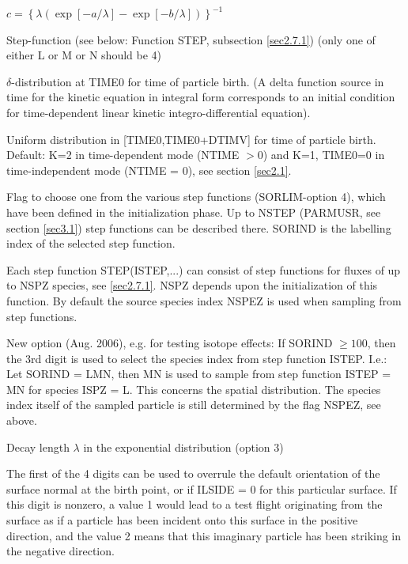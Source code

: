 \begin{list}{ }{}
\begin{list}{ }{}
$c = \left\{ \lambda (\exp[ -a/ \lambda] - \exp[-b/
\lambda])\right\}^{-1}$
\item[{L,M,N = 4 }]
Step-function (see below: Function STEP, subsection \ref{sec2.7.1})
(only one of either
L or M or N should be 4)
\item[{K = 1 }]
$\delta$-distribution at TIME0 for time of particle birth.  (A delta
function source in time for the kinetic equation in integral form
corresponds to an initial condition for time-dependent linear
kinetic integro-differential equation).
\item[{K = 2 }]
Uniform distribution in [TIME0,TIME0+DTIMV] for time of particle
birth.\\
Default: K=2 in time-dependent mode (NTIME $>$0) and K=1, TIME0=0 in
time-independent mode (NTIME = 0), see section \ref{sec2.1}.
\end{list}
\item[{\bf SORIND }]
Flag to choose one from the various step functions (SORLIM-option
4), which have been defined in the initialization phase. Up to NSTEP
(PARMUSR, see section \ref{sec3.1}) step functions can be described
there. SORIND is the labelling index of the selected step function.

Each step function STEP(ISTEP,...) can consist of step functions for
fluxes of up to NSPZ species, see \ref{sec2.7.1}. NSPZ depends upon
the initialization of this function. By default the source species
index NSPEZ is used when sampling from step functions.

New option (Aug. 2006), e.g. for testing isotope effects: If SORIND
$\geq 100$, then the 3rd digit is used to select the species index
from step function ISTEP. I.e.: Let SORIND = LMN, then MN is used to
sample from  step function ISTEP = MN  for species ISPZ = L.
This concerns the spatial distribution. The species index itself of
the sampled particle is still determined by the flag NSPEZ, see
above.


\item[{\bf SOREXP }]
Decay length $\lambda$  in the exponential distribution (option 3)
\item[{\bf SORIFL }]
The first of the 4 digits can be used to overrule the default
orientation of the surface normal at the birth point, or if
ILSIDE = 0 for this particular surface.
If this digit is nonzero, a value
1 would lead to a test flight originating
from the surface as if a particle has been incident onto this surface
in the positive direction, and the value 2 means that this imaginary
particle has been striking in the negative direction.


\end{list}
